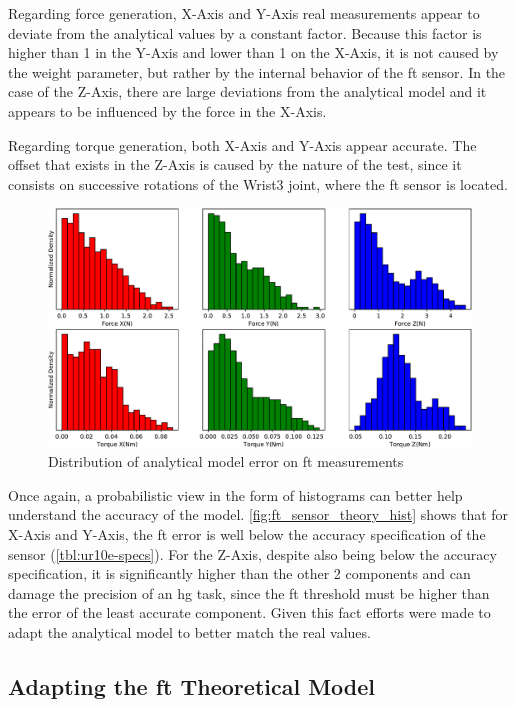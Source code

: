 \par Regarding force generation, X-Axis and Y-Axis real measurements appear to deviate from the analytical values by a constant factor. Because this factor is higher than 1 in the Y-Axis and lower than 1 on the X-Axis, it is not caused by the weight parameter, but rather by the internal behavior of the \ac{ft} sensor. In the case of the Z-Axis, there are large deviations from the analytical model and it appears to be influenced by the force in the X-Axis.
\par Regarding torque generation, both X-Axis and Y-Axis appear accurate. The offset that exists in the Z-Axis is caused by the nature of the test, since it consists on successive rotations of the Wrist3 joint, where the \ac{ft} sensor is located.

\begin{figure}[h]
    \centering
    \includegraphics[width=0.8\linewidth]{figs/chp3/ft_sensor_theory_hist.pdf}
    \caption{Distribution of analytical model error on \ac{ft} measurements}
    \label{fig:ft_sensor_theory_hist}
\end{figure}

\par Once again, a probabilistic view in the form of histograms can better help understand the accuracy of the model. \autoref{fig:ft_sensor_theory_hist} shows that for X-Axis and Y-Axis, the \ac{ft} error is well below the accuracy specification of the sensor (\autoref{tbl:ur10e-specs}). For the Z-Axis, despite also being below the accuracy specification, it is significantly higher than the other 2 components and can damage the precision of an \ac{hg} task, since the \ac{ft} threshold must be higher than the error of the least accurate component. Given this fact efforts were made to adapt the analytical model to better match the real values. 

\subsection{Adapting the \ac{ft} Theoretical Model}
\label{ssec:ft_theory_model}

